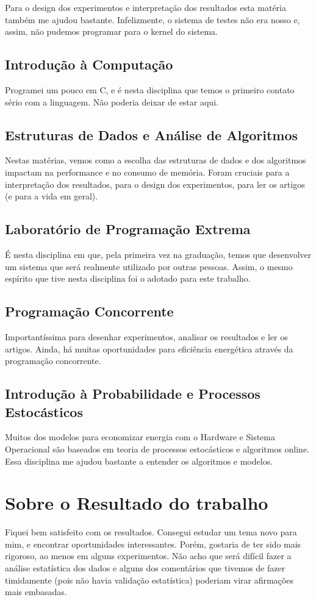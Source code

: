 \documentclass[a4paper,11pt]{article} %
\begin{document}
Para o design dos experimentos e interpretação dos resultados esta matéria também me ajudou bastante. Infelizmente, o sistema de testes não era nosso e, assim, não pudemos programar para o kernel do sistema.

\subsection{Introdução à Computação}

Programei um pouco em C, e é nesta disciplina que temos o primeiro contato sério com a linguagem. Não poderia deixar de estar aqui.


\subsection{Estruturas de Dados e Análise de Algoritmos}

Nestas matérias, vemos como a escolha das estruturas de dados e dos algoritmos impactam na performance e no consumo de memória. Foram cruciais para a interpretação dos resultados, para o design dos experimentos, para ler os artigos (e para a vida em geral).

\subsection{Laboratório de Programação Extrema}

É nesta disciplina em que, pela primeira vez na graduação, temos que desenvolver um sistema que será realmente utilizado por outras pessoas. Assim, o mesmo espírito que tive nesta disciplina foi o adotado para este trabalho.

\subsection{Programação Concorrente}

Importantíssima para desenhar experimentos, analisar os resultados e ler os artigos. Ainda, há muitas oportunidades para eficiência energética através da programação concorrente.

\subsection{Introdução à Probabilidade e Processos Estocásticos}

Muitos dos modelos para economizar energia com o Hardware e Sistema Operacional são baseados em teoria de processos estocásticos e algoritmos online. Essa disciplina me ajudou bastante a entender os algoritmos e modelos.

\section{Sobre o Resultado do trabalho}
\mbox{}

Fiquei bem satisfeito com os resultados. Consegui estudar um tema novo para mim, e encontrar oportunidades interessantes. Porém, gostaria de ter sido mais rigoroso, ao menos em alguns experimentos. Não acho que será difícil fazer a análise estatística dos dados e alguns dos comentários que tivemos de fazer timidamente (pois não havia validação estatística) poderiam virar afirmações mais embasadas.
\end{document}
